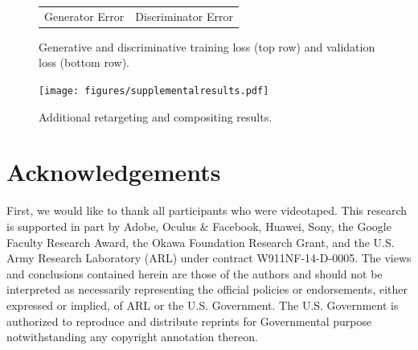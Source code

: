 \documentclass[10pt,twocolumn,letterpaper]{article}
\begin{document}
\begin{figure}[h!]
\begin{tabular}{cc}
Generator Error & Discriminator Error \\ 
\end{tabular}
\caption{Generative and discriminative training loss (top row) and validation loss (bottom row).}\label{fig:error}
\vspace{-0.05in}
\end{figure}

\begin{figure}[th]
\begin{center}
  \texttt{[image: figures/supplementalresults.pdf]} \\
\end{center}
  \caption{Additional retargeting and compositing results.}
  \vspace{-0.05in}
\label{fig:compositenew}
\end{figure}

\section{Acknowledgements}

First, we would like to thank all participants who were videotaped. This research is supported in part by Adobe, Oculus \& Facebook, Huawei, Sony, the Google Faculty Research Award, the Okawa Foundation Research Grant, and the U.S. Army Research Laboratory (ARL) under contract W911NF-14-D-0005. The views and conclusions contained herein are those of the authors and should not be interpreted as necessarily representing the official policies or endorsements, either expressed or implied, of ARL or the U.S. Government. The U.S. Government is authorized to reproduce and distribute reprints for Governmental purpose notwithstanding any copyright annotation thereon. 
\end{document}
